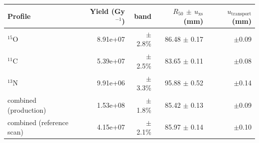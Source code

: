 \begin{tabular}{lrrrr}
\toprule
Profile & Yield (Gy$^{-1}$) & band & $R_{50}$ $\pm$ $u_{\mathrm{xs}}$ (mm) & $u_{\mathrm{transport}}$ (mm) \\
\midrule
$^{15}$O & 8.91e+07 & $\pm$2.8\% & 86.48 $\pm$ 0.17 & $\pm$0.09 \\
$^{11}$C & 5.39e+07 & $\pm$2.5\% & 83.65 $\pm$ 0.11 & $\pm$0.08 \\
$^{13}$N & 9.91e+06 & $\pm$3.3\% & 95.88 $\pm$ 0.52 & $\pm$0.14 \\
combined (production) & 1.53e+08 & $\pm$1.8\% & 85.42 $\pm$ 0.13 & $\pm$0.09 \\
combined (reference scan) & 4.15e+07 & $\pm$2.1\% & 85.97 $\pm$ 0.14 & $\pm$0.10 \\
\bottomrule
\end{tabular}
